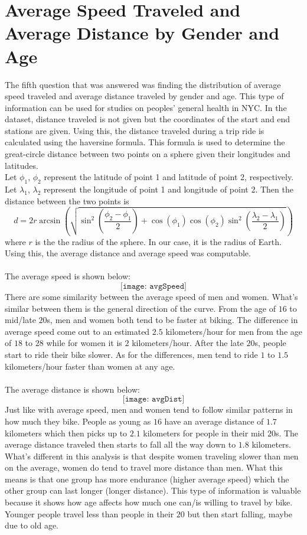 \documentclass{article}
\begin{document}
\section{Average Speed Traveled and Average Distance by Gender and Age}
The fifth question that was answered was finding the distribution of average speed traveled and average distance traveled by gender and age. This type of information can be used for studies on peoples' general health in NYC. In the dataset, distance traveled is not given but the coordinates of the start and end stations are given. Using this, the distance traveled during a trip ride is calculated using the haversine formula. This formula is used to determine the great-circle distance between two points on a sphere given their longitudes and latitudes. \\
Let $\phi_1$, $\phi_2$ represent the latitude of point 1 and latitude of point 2, respectively. Let $\lambda_1$, $\lambda_2$ represent the longitude of point 1 and longitude of point 2. Then the distance between the two points is
$$ d = 2r\arcsin \left( \sqrt{ \sin^2 \left( \frac{\phi_2 - \phi_1}{2} \right) + \cos(\phi_1)\cos(\phi_2)\sin^2\left( \frac{\lambda_2 - \lambda_1}{2}\right)} \right) $$
where $r$ is the the radius of the sphere. In our case, it is the radius of Earth. Using this, the average distance and average speed was computable. \\~\\ 
The average speed is shown below: 
$$ \texttt{[image: avgSpeed]} $$ 
There are some similarity between the average speed of men and women. What's similar between them is the general direction of the curve. From the age of $16$ to mid/late $20$s, men and women both tend to be faster at biking. The difference in average speed come out to an estimated $2.5$ kilometers/hour for men from the age of $18$ to $28$ while for women it is $2$ kilometers/hour. After the late $20$s, people start to ride their bike slower. As for the differences, men tend to ride $1$ to $1.5$ kilometers/hour faster than women at any age. \\~\\
The average distance is shown below: 
$$ \texttt{[image: avgDist]} $$ 
Just like with average speed, men and women tend to follow similar patterns in how much they bike. People as young as $16$ have an average distance of $1.7$ kilometers which then picks up to $2.1$ kilometers for people in their mid $20$s. The average distance traveled then starts to fall all the way down to $1.8$ kilometers. What's different in this analysis is that despite women traveling slower than men on the average, women do tend to travel more distance than men. What this means is that one group has more endurance (higher average speed) which the other group can last longer (longer distance). This type of information is valuable because it shows how age affects how much one can/is willing to travel by bike. Younger people travel less than people in their $20$ but then start falling, maybe due to old age.
\end{document}
